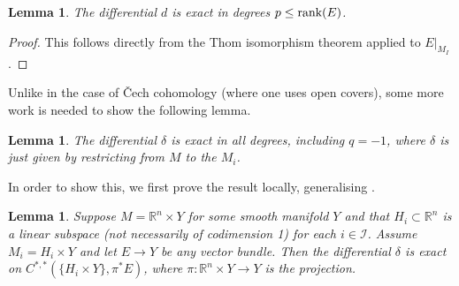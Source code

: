 \documentclass[11pt,psamsfonts, oneside, reqno]{amsart}
\newcommand{\cl}{\colon}
\newcommand{\bR}{\mathbb{R}}
\newcommand{\cI}{\mathcal{I}}
\newcommand{\rank}{\normalfont\text{rank}}
\newtheorem{lemma}[theorem]{Lemma}
\theoremstyle{definition}
\theoremstyle{remark}
\numberwithin{equation}{section}
\begin{document}
\begin{lemma}\label{lem:d-exact}
	The differential $d$ is exact in degrees $p \leq \rank(E)$.
\end{lemma}
\begin{proof}
	This follows directly from the Thom isomorphism theorem applied to $E|_{M_I}$.
\end{proof}
Unlike in the case of \v{C}ech cohomology (where one uses open covers), some more work is needed to show the following lemma.
\begin{lemma}
	\label{lem:global exactness of delta}
	The differential $\delta$ is exact in all degrees, including $q = -1$, where $\delta$ is just given by restricting from $M$ to the $M_i$.
\end{lemma}
In order to show this, we first prove the result locally, generalising \cite[Lemma~2]{Kott}.


\begin{lemma}
	\label{lem:local exactness of delta}
	Suppose $M = \bR^n \times Y$ for some smooth manifold $Y$ and that $H_i \subset \bR^n$ is a linear subspace (not necessarily of codimension 1) for each $i\in\cI$. Assume $M_i = H_i \times Y$ and let $E \rightarrow Y$ be any vector bundle. Then the differential $\delta$ is exact on $C^{*,*}(\{H_i \times Y\}, \pi^*E)$, where $\pi\cl  \bR^n \times Y \rightarrow Y$ is the projection.
\end{lemma}
\end{document}
